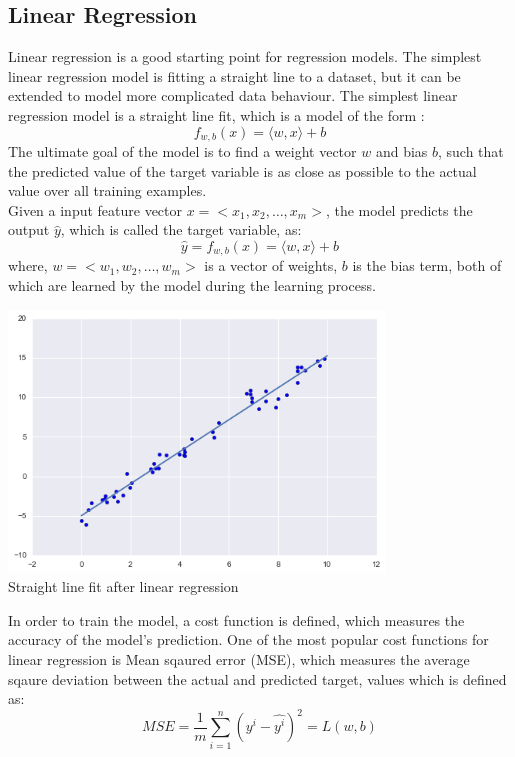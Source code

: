 \documentclass[12pt]{article}
\newcommand{\innerproduct}[2]{\langle#1, #2 \rangle}
\begin{document}
\subsection{Linear Regression}
Linear regression is a good starting point for regression models. The simplest linear regression model is fitting a straight line to a dataset, but it can be extended to model more complicated data behaviour.
The simplest linear regression model is a straight line fit, which is a model of the form :
\begin{equation}
    f_{w,b}(x) = \innerproduct{w}{x} + b
\end{equation}
The ultimate goal of the model is to find a weight vector $w$ and bias $b$, such that the predicted value of the target variable is as close as possible to the actual value over all training examples.
\\Given a input feature vector $x = <x_1,x_2,\dots,x_m>$, the model predicts the output $\hat{y}$, which is called the target variable, as:
\begin{equation}
    \hat{y} = f_{w,b}(x) = \innerproduct{w}{x} + b
\end{equation}
where, $w = <w_1,w_2,\dots,w_m>$ is a vector of weights, $b$ is the bias term, both of which are learned by the model during the learning process.
\begin{center}
    \includegraphics*[width=10cm]{lin-reg.png}\\
    Straight line fit after linear regression
\end{center}
In order to train the model, a cost function is defined, which measures the accuracy of the model's prediction. One of the most popular cost functions for linear regression is Mean sqaured error (MSE), which measures the average sqaure deviation between the actual and predicted target, values which is defined as:
\begin{equation}
    MSE = \frac{1}{m} \sum_{i=1}^{n} (y^i - \hat{y^i})^2 = L(w,b)
\end{equation}
\end{document}
